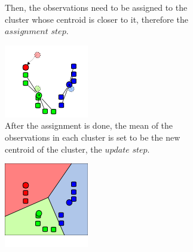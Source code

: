 \begin{figure}[H]
\begin{subfigure}[H]{0.2\textwidth}
        \vspace{1pt}
        \caption{Then, the observations need to be assigned to the cluster whose centroid is closer to it, therefore the $assignment$ $step$.}
    \end{subfigure}
    \quad
    \begin{subfigure}[H]{0.2\textwidth}
        \includegraphics[width=\textwidth]{Images/Methods/K-means/K_Means_Example_Step_3.png}
        \vspace{-10pt}
        \caption{After the assignment is done, the mean of the observations in each cluster is set to be the new centroid of the cluster, the $update$ $step$.}
    \end{subfigure}
    \quad
    \begin{subfigure}[H]{0.2\textwidth} 
        \vspace{-40pt}
        \includegraphics[width=\textwidth]{Images/Methods/K-means/K_Means_Example_Step_4.png}

\end{subfigure}
\end{figure}
